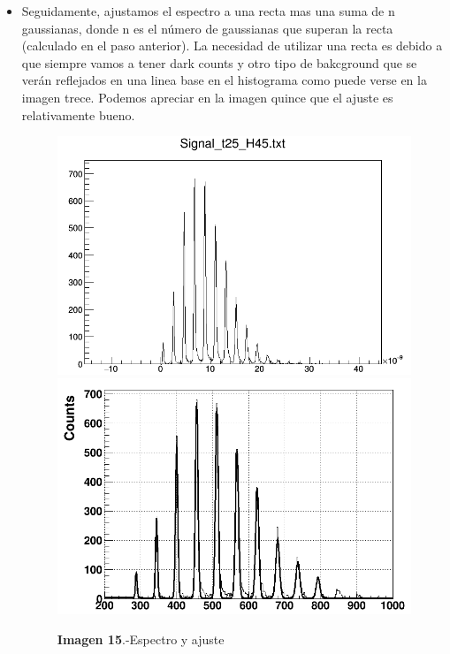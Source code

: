 \documentclass[11pt, a4paper]{article}
\begin{document}
\begin{itemize}
\newpage
\item {} Seguidamente, ajustamos el espectro a una recta mas una suma de n gaussianas, donde n es el número de gaussianas que superan la recta (calculado en el paso anterior). La necesidad de utilizar una recta es debido a que siempre vamos a tener dark counts y otro tipo de bakcground que se verán reflejados en una linea base en el histograma como puede verse en la imagen trece. Podemos apreciar en la imagen quince que el ajuste es relativamente bueno.

\begin{figure}[htb]
\centering
{
\includegraphics[scale=0.2]{Espectroo.png} 
}
{
\includegraphics[scale=0.2]{AjusteEspectro.png} 
}
\caption{\textbf{Imagen 15}.-Espectro y ajuste}
\end{figure} 


\end{itemize}
\end{document}
